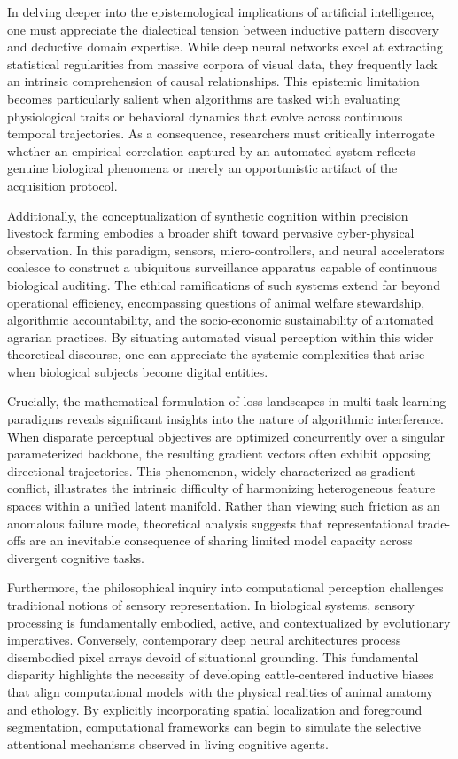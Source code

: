 \documentclass[Times,12pt,oneside,openany,print,index]{report}
\begin{document}
In delving deeper into the epistemological implications of artificial intelligence, one must appreciate the dialectical tension between inductive pattern discovery and deductive domain expertise. While deep neural networks excel at extracting statistical regularities from massive corpora of visual data, they frequently lack an intrinsic comprehension of causal relationships. This epistemic limitation becomes particularly salient when algorithms are tasked with evaluating physiological traits or behavioral dynamics that evolve across continuous temporal trajectories. As a consequence, researchers must critically interrogate whether an empirical correlation captured by an automated system reflects genuine biological phenomena or merely an opportunistic artifact of the acquisition protocol.

Additionally, the conceptualization of synthetic cognition within precision livestock farming embodies a broader shift toward pervasive cyber-physical observation. In this paradigm, sensors, micro-controllers, and neural accelerators coalesce to construct a ubiquitous surveillance apparatus capable of continuous biological auditing. The ethical ramifications of such systems extend far beyond operational efficiency, encompassing questions of animal welfare stewardship, algorithmic accountability, and the socio-economic sustainability of automated agrarian practices. By situating automated visual perception within this wider theoretical discourse, one can appreciate the systemic complexities that arise when biological subjects become digital entities.

Crucially, the mathematical formulation of loss landscapes in multi-task learning paradigms reveals significant insights into the nature of algorithmic interference. When disparate perceptual objectives are optimized concurrently over a singular parameterized backbone, the resulting gradient vectors often exhibit opposing directional trajectories. This phenomenon, widely characterized as gradient conflict, illustrates the intrinsic difficulty of harmonizing heterogeneous feature spaces within a unified latent manifold. Rather than viewing such friction as an anomalous failure mode, theoretical analysis suggests that representational trade-offs are an inevitable consequence of sharing limited model capacity across divergent cognitive tasks.

Furthermore, the philosophical inquiry into computational perception challenges traditional notions of sensory representation. In biological systems, sensory processing is fundamentally embodied, active, and contextualized by evolutionary imperatives. Conversely, contemporary deep neural architectures process disembodied pixel arrays devoid of situational grounding. This fundamental disparity highlights the necessity of developing cattle-centered inductive biases that align computational models with the physical realities of animal anatomy and ethology. By explicitly incorporating spatial localization and foreground segmentation, computational frameworks can begin to simulate the selective attentional mechanisms observed in living cognitive agents.
\end{document}

